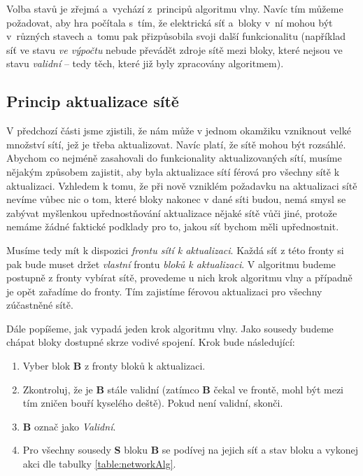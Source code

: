 Volba stavů je zřejmá a~vychází z~principů algoritmu vlny. Navíc tím můžeme požadovat, aby hra počítala s~tím, že elektrická síť a~bloky v~ní mohou být v~různých stavech a~tomu pak přizpůsobila svoji další funkcionalitu (například síť ve stavu \textit{ve výpočtu} nebude převádět zdroje sítě mezi bloky, které nejsou ve stavu \textit{validní} -- tedy těch, které již byly zpracovány algoritmem).

\subsection{Princip aktualizace sítě}

V předchozí části jsme zjistili, že nám může v jednom okamžiku vzniknout velké množství sítí, jež je třeba aktualizovat. Navíc platí, že sítě mohou být rozsáhlé. Abychom co nejméně zasahovali do funkcionality aktualizovaných sítí, musíme nějakým způsobem zajistit, aby byla aktualizace sítí férová pro všechny sítě k aktualizaci. Vzhledem k tomu, že při nově vzniklém požadavku na aktualizaci sítě nevíme vůbec nic o tom, které bloky nakonec v dané síti budou, nemá smysl se zabývat myšlenkou upřednostňování aktualizace nějaké sítě vůči jiné, protože nemáme žádné faktické podklady pro to, jakou síť bychom měli upřednostnit.

Musíme tedy mít k dispozici \textit{frontu sítí k aktualizaci}. Každá síť z této fronty si pak bude muset držet \textit{vlastní} frontu \textit{bloků k aktualizaci}. V algoritmu budeme postupně z fronty vybírat sítě, provedeme u nich krok algoritmu vlny a případně je opět zařadíme do fronty. Tím zajistíme férovou aktualizaci pro všechny zúčastněné sítě.

Dále popíšeme, jak vypadá jeden krok algoritmu vlny. Jako sousedy budeme chápat bloky dostupné skrze vodivé spojení. Krok bude následující:

\begin{enumerate}
	\item Vyber blok \textbf{B} z fronty bloků k aktualizaci.
	\item Zkontroluj, že je \textbf{B} stále validní (zatímco \textbf{B} čekal ve frontě, mohl být mezi tím zničen bouří kyselého deště). Pokud není validní, skonči.
	\item \textbf{B} označ jako \textit{Validní}.
	\item Pro všechny sousedy \textbf{S} bloku \textbf{B} se podívej na jejich síť a stav bloku a vykonej akci dle tabulky \ref{table:networkAlg}.
\end{enumerate}


